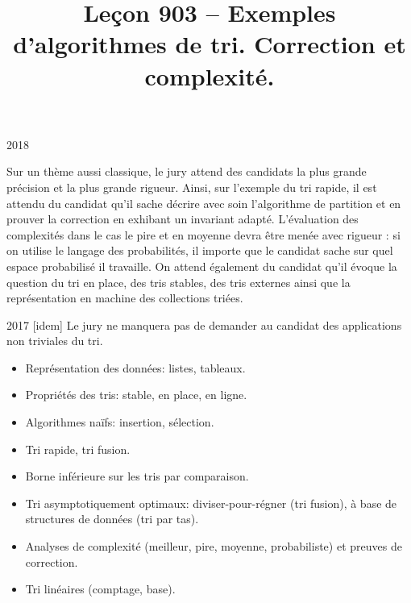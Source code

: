 \documentclass{agregfiche}
\title{Leçon 903 -- Exemples d'algorithmes de tri. Correction et complexité.}
\begin{document}
\maketitle

\secrapports

\begin{rapport}{2018}
	
	Sur un thème aussi classique, le jury attend des candidats la plus grande précision et la plus grande rigueur.
	Ainsi, sur l'exemple du tri rapide, il est attendu du candidat qu'il sache décrire avec soin l'algorithme de partition et en prouver la correction en exhibant un invariant adapté. L'évaluation des complexités dans le cas le pire et en moyenne devra être menée avec rigueur : si on utilise le langage des probabilités, il importe que le candidat sache sur quel espace probabilisé il travaille.
	On attend également du candidat qu'il évoque la question du tri en place, des tris stables, des tris externes ainsi que la représentation en machine des collections triées.
	
\end{rapport}

\begin{rapport}{2017}
    [idem]
    Le jury ne manquera pas de demander au candidat des applications non triviales du tri.
\end{rapport}

\secindispensables

\begin{itemize}
    \item Représentation des données: listes, tableaux. 
    \item Propriétés des tris: stable, en place, en ligne.
    \item Algorithmes naïfs: insertion, sélection.
   \item Tri rapide, tri fusion.
\end{itemize}

\secasavoir
\begin{itemize}
    \item Borne inférieure sur les tris par comparaison.
    \item Tri asymptotiquement optimaux: diviser-pour-régner (tri fusion), à base de structures de données (tri par tas).
	\item Analyses de complexité (meilleur, pire, moyenne, probabiliste) et preuves de correction.
	\item Tri linéaires (comptage, base).
\end{itemize}
\end{document}
